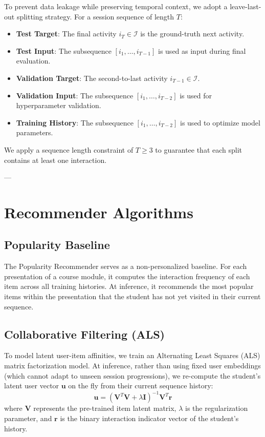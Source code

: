 \documentclass[10pt,journal,compsoc]{IEEEtran}
\begin{document}
To prevent data leakage while preserving temporal context, we adopt a leave-last-out splitting strategy. For a session sequence of length $T$:
\begin{itemize}
    \item \textbf{Test Target}: The final activity $i_T \in \mathcal{I}$ is the ground-truth next activity.
    \item \textbf{Test Input}: The subsequence $[i_1, \dots, i_{T-1}]$ is used as input during final evaluation.
    \item \textbf{Validation Target}: The second-to-last activity $i_{T-1} \in \mathcal{I}$.
    \item \textbf{Validation Input}: The subsequence $[i_1, \dots, i_{T-2}]$ is used for hyperparameter validation.
    \item \textbf{Training History}: The subsequence $[i_1, \dots, i_{T-2}]$ is used to optimize model parameters.
\end{itemize}
We apply a sequence length constraint of $T \ge 3$ to guarantee that each split contains at least one interaction.

---

\section{Recommender Algorithms}

\subsection{Popularity Baseline}
The Popularity Recommender serves as a non-personalized baseline. For each presentation of a course module, it computes the interaction frequency of each item across all training histories. At inference, it recommends the most popular items within the presentation that the student has not yet visited in their current sequence.

\subsection{Collaborative Filtering (ALS)}
To model latent user-item affinities, we train an Alternating Least Squares (ALS) matrix factorization model. At inference, rather than using fixed user embeddings (which cannot adapt to unseen session progressions), we re-compute the student's latent user vector $\mathbf{u}$ on the fly from their current sequence history:
$$\mathbf{u} = \left(\mathbf{V}^T \mathbf{V} + \lambda \mathbf{I}\right)^{-1} \mathbf{V}^T \mathbf{r}$$
where $\mathbf{V}$ represents the pre-trained item latent matrix, $\lambda$ is the regularization parameter, and $\mathbf{r}$ is the binary interaction indicator vector of the student's history.
\end{document}

